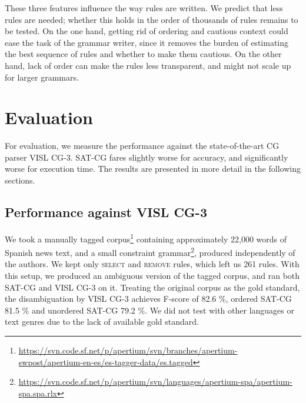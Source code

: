 \noindent These three features influence the way rules are written. 
We predict that less rules are needed; whether this holds in the order
of thousands of rules remains to be tested. On the one hand, getting rid
of ordering and cautious context could ease the task of the grammar
writer, since it removes the burden of estimating the best sequence of
rules and whether to make them cautious. On the other
hand, lack of order can make the rules less transparent, and might not scale up for larger grammars.


\section{Evaluation}
\label{sec:eval}

For evaluation, we measure the performance against the state-of-the-art CG parser VISL CG-3.
SAT-CG fares slightly worse for accuracy, and significantly worse for execution time.
The results are presented in more detail in the following sections.




\subsection{Performance against VISL CG-3}


We took a manually tagged
corpus\footnote{\url{https://svn.code.sf.net/p/apertium/svn/branches/apertium-swpost/apertium-en-es/es-tagger-data/es.tagged}}
containing approximately 22,000 words of Spanish news text, 
and a small constraint grammar\footnote{\url{https://svn.code.sf.net/p/apertium/svn/languages/apertium-spa/apertium-spa.spa.rlx}}, produced independently of the authors.
We kept only \textsc{select} and \textsc{remove} rules, which left us 261 rules.
With this setup, we produced an ambiguous version of the tagged
corpus, and ran both SAT-CG and VISL CG-3 on it.
Treating the original corpus as the gold standard, the disambiguation
by  VISL CG-3 achieves F-score of 82.6 \%, ordered SAT-CG 81.5 \%  and
unordered SAT-CG 79.2 \%. 
We did not test with other languages or text genres due to the lack of
available gold standard.

